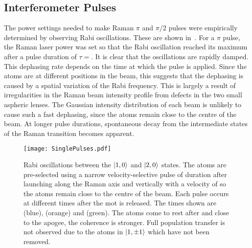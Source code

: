 \subsection{Interferometer Pulses}\label{subsec:int_pulses}
The power settings needed to make Raman $\pi$ and $\pi/2$ pulses were
empirically determined by observing Rabi oscillations. These are shown
in~. For a $\pi$ pulse, the Raman
laser power was
set so that the Rabi oscillation reached its maximum after a pulse duration of
\(\tau = \). It is clear that the oscillations
are rapidly damped. This dephasing rate depends on the
time at which the pulse is applied. Since the atoms are at different
positions in the beam, this suggests that the dephasing is caused by a
spatial variation of the Rabi frequency. This is largely a result of
irregularities in the Raman beam intensity profile from defects in
the two small aspheric lenses. The Gaussian intensity distribution of each beam
is unlikely to cause such a fast dephasing, since the atoms remain
close to the centre of the beam. At longer pulse durations,
spontaneous decay from the intermediate states of the Raman transition
becomes apparent.
\begin{figure}[htpb]
  \centering
  \texttt{[image: SinglePulses.pdf]}
  \caption[Rabi oscillations between the $\ket{1,0}$ and $\ket{2,0}$
    states.]{Rabi oscillations between the $\ket{1,0}$ and $\ket{2,0}$
    states. The atoms are pre-selected using a narrow
    velocity-selective pulse of duration  after
    launching along the Raman axis and vertically with a velocity of
     so the atoms
    remain close to the centre of the beam. Each pulse occurs at different times after the \ac{mot} is
    released. The times shown are  (blue),
   (orange) and  (green). The atoms
  come to rest after  and close to the apogee, the
  coherence is stronger. Full
  population transfer is not observed due to the atoms in $\ket{1,\pm
1}$ which have not been removed. }
\label{fig:rabi_oscillation}
\end{figure}
